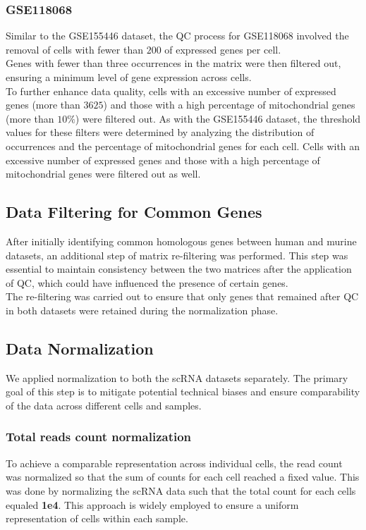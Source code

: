 \documentclass[10pt]{SelfArx} %
\begin{document}
\subsubsection*{GSE118068}
Similar to the GSE155446 dataset, the QC process for GSE118068 involved the removal of cells with fewer than $200$ of expressed genes per cell. \\
Genes with fewer than three occurrences in the matrix were then filtered out, ensuring a minimum level of gene expression across cells. \\
To further enhance data quality, cells with an excessive number of expressed genes (more than $3625$) and those with a high percentage of mitochondrial genes (more than $10\%$) were filtered out. As with the GSE155446 dataset, the threshold values for these filters were determined by analyzing the distribution of occurrences and the percentage of mitochondrial genes for each cell. Cells with an excessive number of expressed genes and those with a high percentage of mitochondrial genes were filtered out as well.\\

\subsection{Data Filtering for Common Genes}
After initially identifying common homologous genes between human and murine datasets, an additional step of matrix re-filtering was performed. This step was essential to maintain consistency between the two matrices after the application of QC, which could have influenced the presence of certain genes. \\
The re-filtering was carried out to ensure that only genes that remained after QC in both datasets were retained during the normalization phase. 

\subsection{Data Normalization}\label{sec:normalization}
We applied normalization to both the scRNA datasets separately. The primary goal of this step is to mitigate potential technical biases and ensure comparability of the data across different cells and samples. 

\subsubsection{Total reads count normalization}\label{sec:normalization_methods}
To achieve a comparable representation across individual cells, the read count was normalized so that the sum of counts for each cell reached a fixed value. This was done by normalizing the scRNA data such that the total count for each cells equaled \textbf{1e4}. This approach is widely employed to ensure a uniform representation of cells within each sample.
\end{document}
